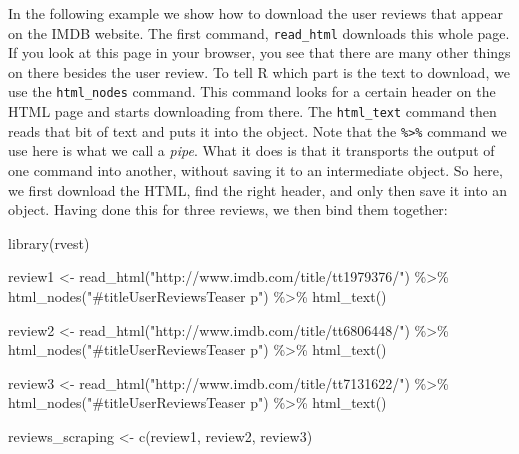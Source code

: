 \documentclass[
]{book}
\newenvironment{Shaded}{\begin{snugshade}}{\end{snugshade}}
\newcommand{\FunctionTok}[1]{\textcolor[rgb]{0.00,0.00,0.00}{#1}}
\newcommand{\NormalTok}[1]{#1}
\newcommand{\OtherTok}[1]{\textcolor[rgb]{0.56,0.35,0.01}{#1}}
\newcommand{\SpecialCharTok}[1]{\textcolor[rgb]{0.00,0.00,0.00}{#1}}
\newcommand{\StringTok}[1]{\textcolor[rgb]{0.31,0.60,0.02}{#1}}
\begin{document}
In the following example we show how to download the user reviews that appear on the IMDB website. The first command, \texttt{read\_html} downloads this whole page. If you look at this page in your browser, you see that there are many other things on there besides the user review. To tell R which part is the text to download, we use the \texttt{html\_nodes} command. This command looks for a certain header on the HTML page and starts downloading from there. The \texttt{html\_text} command then reads that bit of text and puts it into the object. Note that the \texttt{\%\textgreater{}\%} command we use here is what we call a \emph{pipe}. What it does is that it transports the output of one command into another, without saving it to an intermediate object. So here, we first download the HTML, find the right header, and only then save it into an object. Having done this for three reviews, we then bind them together:

\begin{Shaded}
\begin{Highlighting}[]
\FunctionTok{library}\NormalTok{(rvest)}

\NormalTok{review1 }\OtherTok{\textless{}{-}} \FunctionTok{read\_html}\NormalTok{(}\StringTok{"http://www.imdb.com/title/tt1979376/"}\NormalTok{) }\SpecialCharTok{\%\textgreater{}\%}
 \FunctionTok{html\_nodes}\NormalTok{(}\StringTok{"\#titleUserReviewsTeaser p"}\NormalTok{) }\SpecialCharTok{\%\textgreater{}\%}
 \FunctionTok{html\_text}\NormalTok{()}

\NormalTok{review2 }\OtherTok{\textless{}{-}} \FunctionTok{read\_html}\NormalTok{(}\StringTok{"http://www.imdb.com/title/tt6806448/"}\NormalTok{) }\SpecialCharTok{\%\textgreater{}\%}
 \FunctionTok{html\_nodes}\NormalTok{(}\StringTok{"\#titleUserReviewsTeaser p"}\NormalTok{) }\SpecialCharTok{\%\textgreater{}\%}
 \FunctionTok{html\_text}\NormalTok{()}

\NormalTok{review3 }\OtherTok{\textless{}{-}} \FunctionTok{read\_html}\NormalTok{(}\StringTok{"http://www.imdb.com/title/tt7131622/"}\NormalTok{) }\SpecialCharTok{\%\textgreater{}\%}
 \FunctionTok{html\_nodes}\NormalTok{(}\StringTok{"\#titleUserReviewsTeaser p"}\NormalTok{) }\SpecialCharTok{\%\textgreater{}\%}
 \FunctionTok{html\_text}\NormalTok{()}

\NormalTok{reviews\_scraping }\OtherTok{\textless{}{-}} \FunctionTok{c}\NormalTok{(review1, review2, review3)}
\end{Highlighting}
\end{Shaded}
\end{document}
